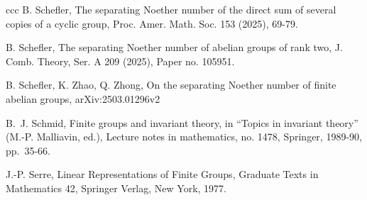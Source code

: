\documentclass[12pt, oneside]{amsart}
\begin{document}
\begin{thebibliography}{ccc}
 B. Schefler, The separating Noether number of the direct sum of several copies of a cyclic group, 
Proc. Amer. Math. Soc. 153 (2025), 69-79. 

 B. Schefler, The separating Noether number of abelian groups of rank two, 
J. Comb. Theory, Ser. A 209 (2025), Paper no. 105951. 

 B. Schefler, K. Zhao, Q. Zhong, 
On the separating Noether number of finite abelian groups, 
arXiv:2503.01296v2

B.~J. Schmid, Finite groups and invariant theory, in ``Topics in invariant theory'' (M.-P. Malliavin, ed.), Lecture notes in mathematics, no. 1478,
  Springer, 1989-90, pp.~35-66.

 J.-P. Serre, Linear Representations of Finite Groups, 
Graduate Texts in Mathematics 42, Springer Verlag, New York, 1977. 


\end{thebibliography}
\end{document}
